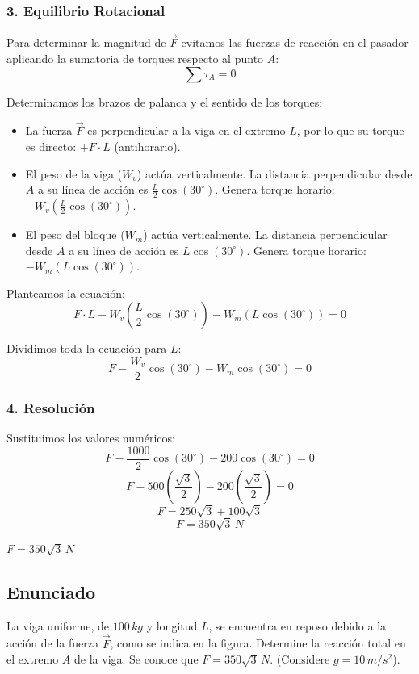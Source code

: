 \documentclass[12pt, a4paper]{article}
\begin{document}
\subsubsection*{3. Equilibrio Rotacional}
Para determinar la magnitud de $\vec{F}$ evitamos las fuerzas de reacción en el pasador aplicando la sumatoria de torques respecto al punto $A$:
$$\sum \tau_A = 0$$

Determinamos los brazos de palanca y el sentido de los torques:
\begin{itemize}
    \item La fuerza $\vec{F}$ es perpendicular a la viga en el extremo $L$, por lo que su torque es directo: $+F \cdot L$ (antihorario).
    \item El peso de la viga ($W_v$) actúa verticalmente. La distancia perpendicular desde $A$ a su línea de acción es $\frac{L}{2} \cos(30^\circ)$. Genera torque horario: $-W_v \left( \frac{L}{2} \cos(30^\circ) \right)$.
    \item El peso del bloque ($W_m$) actúa verticalmente. La distancia perpendicular desde $A$ a su línea de acción es $L \cos(30^\circ)$. Genera torque horario: $-W_m (L \cos(30^\circ))$.
\end{itemize}

Planteamos la ecuación:
$$F \cdot L - W_v \left( \frac{L}{2} \cos(30^\circ) \right) - W_m (L \cos(30^\circ)) = 0$$

Dividimos toda la ecuación para $L$:
$$F - \frac{W_v}{2} \cos(30^\circ) - W_m \cos(30^\circ) = 0$$

\subsubsection*{4. Resolución}
Sustituimos los valores numéricos:
$$F - \frac{1000}{2} \cos(30^\circ) - 200 \cos(30^\circ) = 0$$
$$F - 500 \left( \frac{\sqrt{3}}{2} \right) - 200 \left( \frac{\sqrt{3}}{2} \right) = 0$$
$$F = 250\sqrt{3} + 100\sqrt{3}$$
$$F = 350\sqrt{3} \, \si{N}$$

\begin{tcolorbox}[colback=green!5!white, colframe=green!50!black, title=Respuesta Final]
\centering \Large $F = 350\sqrt{3} \, \si{N}$
\end{tcolorbox}

\newpage

\subsection*{Enunciado}
La viga uniforme, de $100 \, \si{kg}$ y longitud $L$, se encuentra en reposo debido a la acción de la fuerza $\vec{F}$, como se indica en la figura. Determine la reacción total en el extremo $A$ de la viga. Se conoce que $F = 350\sqrt{3} \, \si{N}$. (Considere $g=10\,\si{m/s^2}$).
\end{document}
